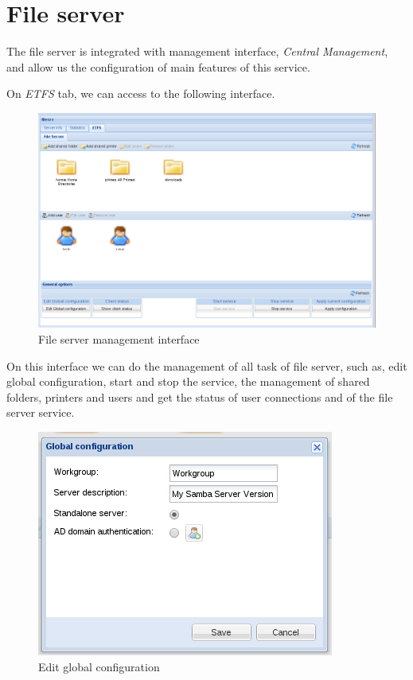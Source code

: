 \section{File server}

The file server is integrated with management interface, \emph{Central Management}, and allow us the configuration of main features of this service.

On \emph{ETFS} tab, we can access to the following interface.

\begin{figure}[H]
    \begin{center}
    \includegraphics[scale=0.38]{screenshots/etfs/etfs_main.png}
    \caption{File server management interface}
    \label{fig:etfs_main}
    \end{center}
\end{figure}

On this interface we can do the management of all task of file server, such as, edit global configuration, start and stop the service, the management of shared folders, printers and users and get the status of user connections and of the file server service.

\begin{figure}[H]
    \begin{center}
    \includegraphics[scale=0.38]{screenshots/etfs/etfs_edit_global_config_user.png}
    \caption{Edit global configuration}
    \label{fig:etfs_global_config_user}
    \end{center}
\end{figure}

